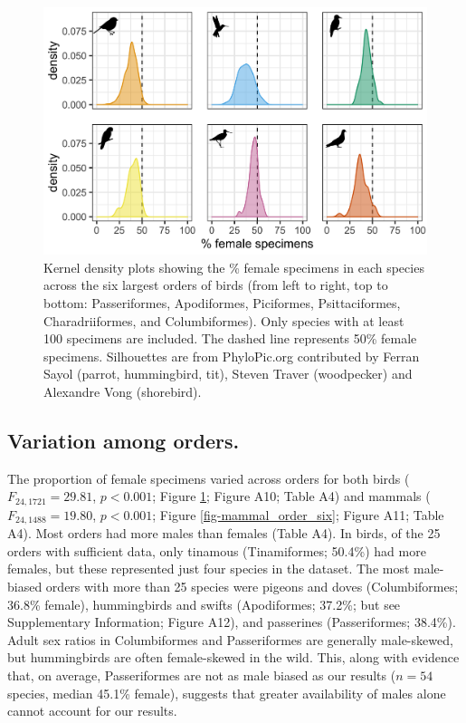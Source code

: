 \documentclass[a4paper, 12pt]{article}
\begin{document}
\begin{figure}
 \centering
  \includegraphics[width = \linewidth]{figures/orders-density-birds-six.png}
  \caption{Kernel density plots showing the \% female specimens in each species across the six largest orders of birds (from left to right, top to bottom: Passeriformes, Apodiformes, Piciformes, Psittaciformes, Charadriiformes, and Columbiformes). 
  Only species with at least 100 specimens are included. 
  The dashed line represents 50\% female specimens. 
  Silhouettes are from PhyloPic.org contributed by Ferran Sayol (parrot, hummingbird, tit), Steven Traver (woodpecker) and Alexandre Vong (shorebird).}
  \label{fig-bird_order_six}
\end{figure}

\subsection{Variation among orders.} 
The proportion of female specimens varied across orders for both birds ($F_{24, 1721} = 29.81$, $p < 0.001$; Figure \ref{fig-bird_order_six}; Figure A10; Table A4) and mammals ($F_{24, 1488} = 19.80$, $p < 0.001$; Figure \ref{fig-mammal_order_six}; Figure A11; Table A4). 
Most orders had more males than females (Table A4). 
In birds, of the 25 orders with sufficient data, only tinamous (Tinamiformes; 50.4\%) had more females, but these represented just four species in the dataset. 
The most male-biased orders with more than 25 species were pigeons and doves (Columbiformes; 36.8\% female), hummingbirds and swifts (Apodiformes; 37.2\%; but see Supplementary Information; Figure A12), and passerines (Passeriformes; 38.4\%). 
Adult sex ratios in Columbiformes and Passeriformes are generally male-skewed\cite{szekely2014sex,bosque2019skewed,mayr1939sex}, but hummingbirds are often female-skewed in the wild\cite{szekely2014sex,mayr1939sex}. 
This, along with evidence that, on average, Passeriformes are not as male biased as our results ($n = 54$ species, median 45.1\% female\cite{szekely2014sex}), suggests that greater availability of males alone cannot account for our results.
\end{document}
